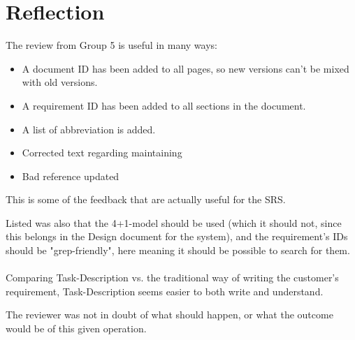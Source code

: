 \documentclass[Main]{subfiles}
\begin{document}
\chapter{Reflection}

The review from Group 5 is useful in many ways:

\begin{itemize}

\item A document ID has been added to all pages, so new versions can't be mixed with old versions.

\item A requirement ID has been added to all sections in the document.

\item A list of abbreviation is added.

\item Corrected text regarding maintaining

\item Bad reference updated 

\end{itemize}
This is some of the feedback that are actually useful for the SRS.

Listed was also that the 4+1-model should be used (which it should not, since this belongs in the Design document for the system), and the requirement's IDs should be "grep-friendly", here meaning it should be possible to search for them.
\\
\\
Comparing Task-Description vs. the traditional way of writing the customer's requirement, Task-Description seems easier to both write and understand.

The reviewer was not in doubt of what should happen, or what the outcome would be of this given operation.
\end{document}
